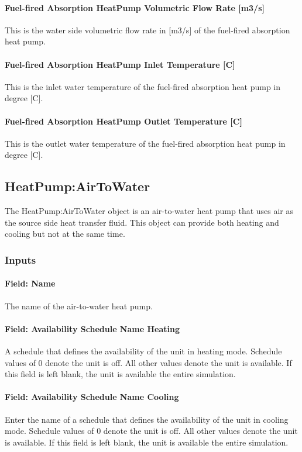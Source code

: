 \paragraph{Fuel-fired Absorption HeatPump Volumetric Flow Rate [m3/s]}
This is the water side volumetric flow rate in [m3/s] of the fuel-fired absorption heat pump.

\paragraph{Fuel-fired Absorption HeatPump Inlet Temperature [C]}
This is the inlet water temperature of the fuel-fired absorption heat pump in degree [C].

\paragraph{Fuel-fired Absorption HeatPump Outlet Temperature [C]}
This is the outlet water temperature of the fuel-fired absorption heat pump in degree [C].

\subsection{HeatPump:AirToWater}\label{plhp_air_to_water}

The HeatPump:AirToWater object is an air-to-water heat pump that uses air as the
source side heat transfer fluid. This object can provide both heating and
cooling but not at the same time.

\subsubsection{Inputs}
\paragraph{Field: Name} The name of the air-to-water heat pump.

\paragraph{Field: Availability Schedule Name Heating} A schedule that defines the
availability of the unit in heating mode. Schedule values of 0 denote the unit
is off. All other values denote the unit is available. If this field is left
blank, the unit is available the entire simulation.
\paragraph{Field: Availability Schedule Name Cooling} Enter the name of a
schedule that defines the availability of the unit in cooling mode. Schedule
values of 0 denote the unit is off. All other values denote the unit is
available. If this field is left blank, the unit is available the entire
simulation.
